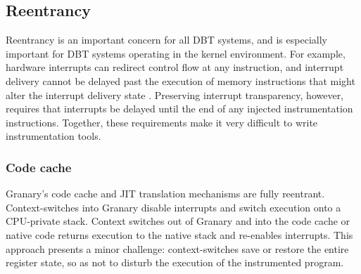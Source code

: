 \documentclass[preprint]{sigplanconf}
\begin{document}
\subsection{Reentrancy}
Reentrancy is an important concern for all DBT systems, and is especially important for DBT systems operating in the kernel environment. For example, hardware interrupts can redirect control flow at any instruction, and interrupt delivery cannot be delayed past the execution of memory instructions that might alter the interrupt delivery state \cite{DRK}. Preserving interrupt transparency, however, requires that interrupts be delayed until the end of any injected instrumentation instructions.  Together, these requirements make it very difficult to write instrumentation tools.

\subsubsection{Code cache}
Granary's code cache and JIT translation mechanisms are fully reentrant. Context-switches into Granary disable interrupts and switch execution onto a CPU-private stack. Context switches out of Granary and into the code cache or native code returns execution to the native stack and re-enables interrupts. This approach presents a minor challenge: context-switches save or restore the entire register state, so as not to disturb the execution of the instrumented program. 



\end{document}
